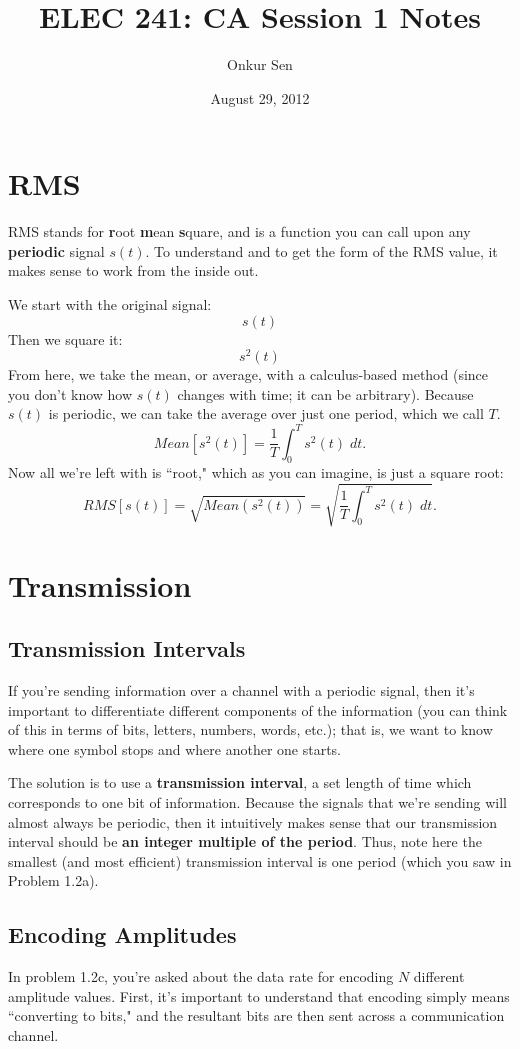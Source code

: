 \documentclass[11pt]{article}
\title{ELEC 241: CA Session 1 Notes}
\author{Onkur Sen}
\date{August 29, 2012}
\begin{document}
\maketitle

\section{RMS}
RMS stands for {\bf r}oot {\bf m}ean {\bf s}quare, and is a function you can call upon any {\bf periodic} signal $s(t)$. To understand and to get the form of the RMS value, it makes sense to work from the inside out. 

\noindent We start with the original signal:
\[s(t)\]
Then we square it:
\[s^2(t)\]
From here, we take the mean, or average, with a calculus-based method (since you don't know how $s(t)$ changes with time; it can be arbitrary). Because $s(t)$ is periodic, we can take the average over just one period, which we call $T$.
\[Mean[s^2(t)] = \frac{1}{T} \int_0^T s^2(t)\; dt.\]
Now all we're left with is ``root," which as you can imagine, is just a square root:
\[\boxed{ RMS[s(t)] = \sqrt{Mean(s^2(t))} = \sqrt{\frac{1}{T} \int_0^T s^2(t)\; dt}.}\]

\section{Transmission}

\subsection{Transmission Intervals}
If you're sending information over a channel with a periodic signal, then it's important to differentiate different components of the information (you can think of this in terms of bits, letters, numbers, words, etc.); that is, we want to know where one symbol stops and where another one starts.

The solution is to use a {\bf transmission interval}, a set length of time which corresponds to one bit of information. Because the signals that we're sending will almost always be periodic, then it intuitively makes sense that our transmission interval should be {\bf an integer multiple of the period}. Thus, note here the smallest (and most efficient) transmission interval is one period (which you saw in Problem 1.2a).

\subsection{Encoding Amplitudes}
In problem 1.2c, you're asked about the data rate for encoding $N$ different amplitude values. First, it's important to understand that encoding simply means ``converting to bits," and the resultant bits are then sent across a communication channel.
\end{document}
